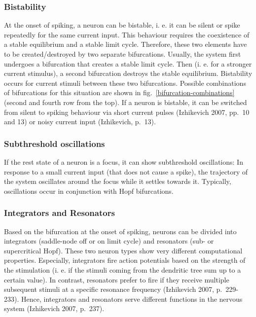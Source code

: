 \documentclass[12pt,a4paper,]{report}
\begin{document}
\subsubsection{Bistability}\label{bistability}

At the onset of spiking, a neuron can be bistable, i. e. it can be
silent or spike repeatedly for the same current input. This behaviour
requires the coexistence of a stable equilibrium and a stable limit
cycle. Therefore, these two elements have to be created/destroyed by two
separate bifurcations. Usually, the system first undergoes a bifurcation
that creates a stable limit cycle. Then (i. e. for a stronger current
stimulus), a second bifurcation destroys the stable equilibrium.
Bistability occurs for current stimuli between these two bifurcations.
Possible combinations of bifurcations for this situation are shown in
fig.~\ref{bifurcation-combinations} (second and fourth row from the
top). If a neuron is bistable, it can be switched from silent to spiking
behaviour via short current pulses (Izhikevich 2007, pp.~10 and 13) or
noisy current input (Izhikevich, p.~13).

\subsubsection{Subthreshold
oscillations}\label{subthreshold-oscillations}

If the rest state of a neuron is a focus, it can show subthreshold
oscillations: In response to a small current input (that does not cause
a spike), the trajectory of the system oscillates around the focus while
it settles towards it. Typically, oscillations occur in conjunction with
Hopf bifurcations.

\subsubsection{Integrators and
Resonators}\label{integrators-and-resonators}

Based on the bifurcation at the onset of spiking, neurons can be divided
into integrators (saddle-node off or on limit cycle) and resonators
(sub- or supercritical Hopf). These two neuron types show very different
computational properties. Especially, integrators fire action potentials
based on the strength of the stimulation (i. e. if the stimuli coming
from the dendritic tree sum up to a certain value). In contrast,
resonators prefer to fire if they receive multiple subsequent stimuli at
a specific resonance frequency (Izhikevich 2007, p.~229-233). Hence,
integrators and resonators serve different functions in the nervous
system (Izhikevich 2007, p.~237).
\end{document}
